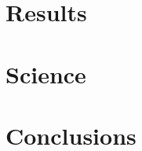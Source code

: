 \documentclass[twocolumn,numberedappendix]{emulateapj}
\begin{document}
% 


\section{Results}

\section{Science}

\section{Conclusions}


%
%
\end{document}
